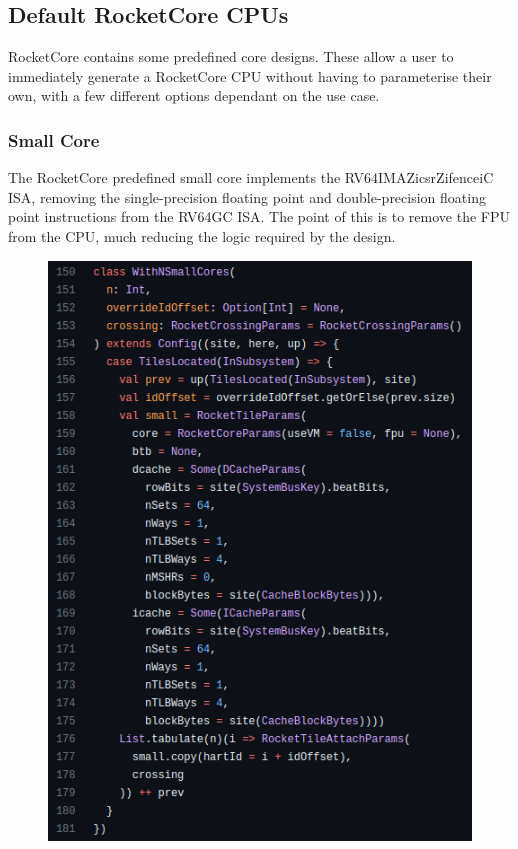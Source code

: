 \subsection{Default RocketCore CPUs}
RocketCore contains some predefined core designs. These allow a user to immediately generate a RocketCore CPU without having to parameterise their own, with a few different options dependant on the use case.

\subsubsection{Small Core}
The RocketCore predefined small core implements the RV64IMAZicsrZifenceiC ISA, removing the single-precision floating point and double-precision floating point instructions from the RV64GC ISA. The point of this is to remove the FPU from the CPU, much reducing the logic required by the design.

\begin{figure}
    \includegraphics[]{./img/rocketcore_default_small.png}
\end{figure}

